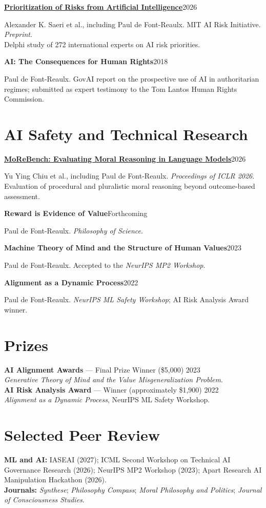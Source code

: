 \documentclass[11pt,letterpaper]{article}
\newcommand{\entry}[2]{\textbf{#1}\hfill #2\par}
\begin{document}
\entry{\href{https://airisk.mit.edu/priorities}{Prioritization of Risks from Artificial Intelligence}}{2026}
Alexander K. Saeri et al., including Paul de Font-Reaulx. MIT AI Risk Initiative. \textit{Preprint}.\\
Delphi study of 272 international experts on AI risk priorities.

\entry{AI: The Consequences for Human Rights}{2018}
Paul de Font-Reaulx. GovAI report on the prospective use of AI in authoritarian regimes; submitted as expert testimony to the Tom Lantos Human Rights Commission.

\section{AI Safety and Technical Research}
\entry{\href{https://morebench.github.io/}{MoReBench: Evaluating Moral Reasoning in Language Models}}{2026}
Yu Ying Chiu et al., including Paul de Font-Reaulx. \textit{Proceedings of ICLR 2026}.\\
Evaluation of procedural and pluralistic moral reasoning beyond outcome-based assessment.

\entry{Reward is Evidence of Value}{Forthcoming}
Paul de Font-Reaulx. \textit{Philosophy of Science}.

\entry{Machine Theory of Mind and the Structure of Human Values}{2023}
Paul de Font-Reaulx. Accepted to the \textit{NeurIPS MP2 Workshop}.

\entry{Alignment as a Dynamic Process}{2022}
Paul de Font-Reaulx. \textit{NeurIPS ML Safety Workshop}; AI Risk Analysis Award winner.

\section{Prizes}
\textbf{AI Alignment Awards} --- Final Prize Winner (\$5,000) \hfill 2023\\
\textit{Generative Theory of Mind and the Value Misgeneralization Problem}.\\[3pt]
\textbf{AI Risk Analysis Award} --- Winner (approximately \$1,900) \hfill 2022\\
\textit{Alignment as a Dynamic Process}, NeurIPS ML Safety Workshop.

\section{Selected Peer Review}
\textbf{ML and AI:} IASEAI (2027); ICML Second Workshop on Technical AI Governance Research (2026); NeurIPS MP2 Workshop (2023); Apart Research AI Manipulation Hackathon (2026).\\
\textbf{Journals:} \textit{Synthese}; \textit{Philosophy Compass}; \textit{Moral Philosophy and Politics}; \textit{Journal of Consciousness Studies}.
\end{document}
